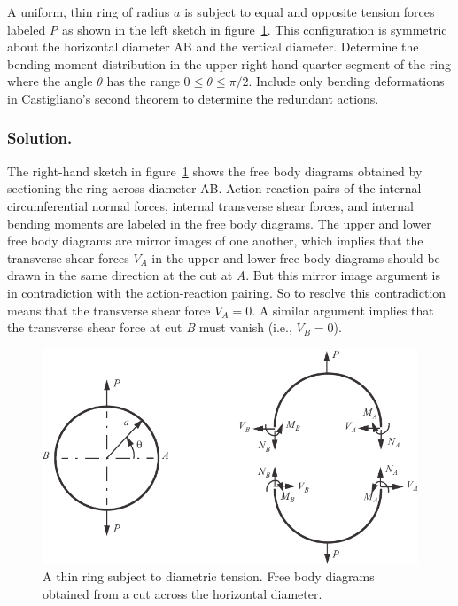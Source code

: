 \documentclass{AeroStructure-ERJohnson}
\begin{document}
\vspace*{-6pt}
\begin{example}\label{ex7.4}A uniform, thin ring of radius $a$ is subject to equal and opposite tension forces labeled \textit{P} as shown in the left sketch in figure~\ref{fig7.10}. This configuration is symmetric about the horizontal diameter AB and the vertical diameter. Determine the bending moment distribution in the upper right-hand quarter segment of the ring where the angle $\theta$ has the range $0 \leq \theta \leq \pi / 2$. Include only bending deformations in Castigliano's second theorem to determine the redundant actions.

\subsubsection{Solution.} The right-hand sketch in figure~\ref{fig7.10} shows the free body diagrams obtained by sectioning the ring across diameter AB. Action-reaction pairs of the internal circumferential normal forces, internal transverse shear forces, and internal bending moments are labeled in the free body diagrams. The upper and lower free body diagrams are mirror images of one another, which implies that the transverse shear forces $V_{A}$ in the upper and lower free body diagrams should be drawn in the same direction at the cut at \textit{A}. But this mirror image argument is in contradiction with the action-reaction pairing. So to resolve this contradiction means that the transverse shear force $V_{A}=0$. A similar argument implies that the transverse shear force at cut \textit{B} must vanish (i.e., $V_{B}=0$).

{\def\thefigure{7.10}
\begin{figure}[!h]
\centerline{\includegraphics{Figure_7-10.pdf}}
\caption{A thin ring subject to diametric tension. Free body diagrams obtained from a cut across the horizontal diameter.}\label{fig7.10}
\vspace*{4pt}
\end{figure}}


\end{example}
\end{document}
